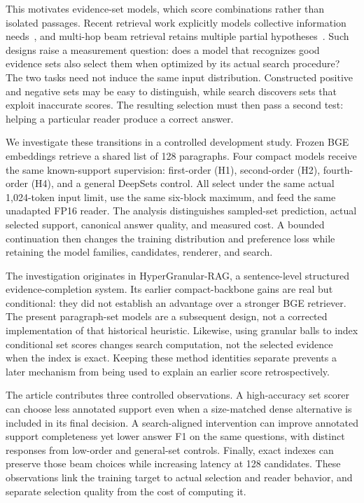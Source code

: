 \documentclass[pdflatex,sn-mathphys-num]{sn-jnl}
\begin{document}
This motivates evidence-set models, which score combinations rather than
isolated passages. Recent retrieval work explicitly models collective
information needs~\cite{lee2025setr}, and multi-hop beam retrieval retains
multiple partial hypotheses~\cite{zhang2024beam}. Such designs raise a
measurement question: does a model that recognizes good evidence sets also
select them when optimized by its actual search procedure? The two tasks
need not induce the same input distribution. Constructed positive and
negative sets may be easy to distinguish, while search discovers sets that
exploit inaccurate scores. The resulting selection must then pass a second
test: helping a particular reader produce a correct answer.

We investigate these transitions in a controlled development study. Frozen
BGE embeddings retrieve a shared list of 128 paragraphs. Four compact
models receive the same known-support supervision: first-order (H1),
second-order (H2), fourth-order (H4), and a general DeepSets control.
All select under the same actual 1,024-token input limit, use the same
six-block maximum, and feed the same unadapted FP16 reader. The analysis
distinguishes sampled-set prediction, actual selected support, canonical
answer quality, and measured cost. A bounded continuation then changes the
training distribution and preference loss while retaining the model
families, candidates, renderer, and search.

The investigation originates in HyperGranular-RAG, a sentence-level
structured evidence-completion system. Its earlier compact-backbone gains
are real but conditional: they did not establish an advantage over a
stronger BGE retriever. The present paragraph-set models are a subsequent
design, not a corrected implementation of that historical heuristic.
Likewise, using granular balls to index conditional set scores changes
search computation, not the selected evidence when the index is exact.
Keeping these method identities separate prevents a later mechanism from
being used to explain an earlier score retrospectively.

The article contributes three controlled observations. A high-accuracy
set scorer can choose less annotated support even when a size-matched dense
alternative is included in its final decision. A search-aligned intervention
can improve annotated support completeness yet lower answer F1 on the same
questions, with distinct responses from low-order and general-set controls.
Finally, exact indexes can preserve those beam choices while increasing
latency at 128 candidates. These observations link the training target to
actual selection and reader behavior, and separate selection quality from
the cost of computing it.
\end{document}
